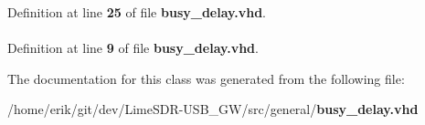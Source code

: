 Definition at line {\bf 25} of file {\bf busy\+\_\+delay.\+vhd}.

\paragraph[{std\+\_\+logic\+\_\+1164}]{\hspace{0.3cm}{\ttfamily [Package]}}\label{classbusy__delay_acd03516902501cd1c7296a98e22c6fcb}


Definition at line {\bf 9} of file {\bf busy\+\_\+delay.\+vhd}.



The documentation for this class was generated from the following file\+:\begin{DoxyCompactItemize}
\item 
/home/erik/git/dev/\+Lime\+S\+D\+R-\/\+U\+S\+B\+\_\+\+G\+W/src/general/{\bf busy\+\_\+delay.\+vhd}\end{DoxyCompactItemize}

